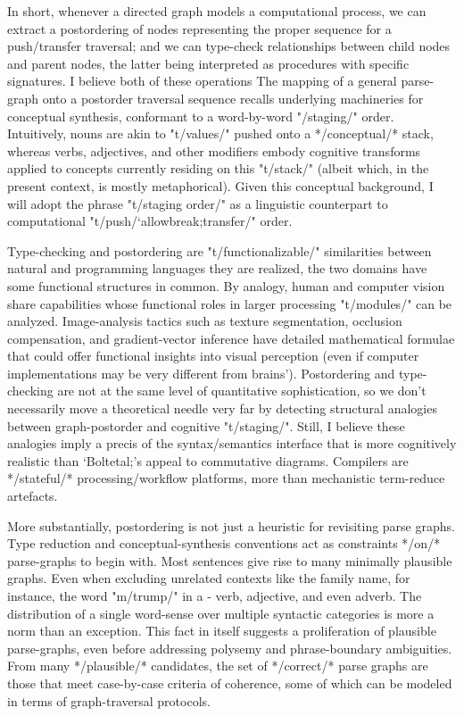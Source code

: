 In short, whenever a directed graph models a computational 
process, we can extract a postordering of nodes 
representing the proper sequence for a push/transfer traversal; 
and we can type-check relationships between 
child nodes and parent nodes, the latter being interpreted 
as procedures with specific signatures.  I believe 
both of these operations %
The mapping of a general parse-graph onto 
a postorder traversal sequence recalls   
underlying machineries for conceptual synthesis, 
conformant to a word-by-word "/staging/" order.  
Intuitively, nouns are akin to 
"t/values/" pushed onto a */conceptual/* stack, 
whereas verbs, adjectives, and other modifiers 
embody cognitive transforms applied to concepts 
currently residing on this "t/stack/" 
(albeit which, in the present context, is mostly metaphorical).  
Given this conceptual background, I will adopt the 
phrase "t/staging order/" as a linguistic 
counterpart to computational "t/push/`allowbreak;transfer/" order. 

Type-checking and postordering are "t/functionalizable/" 
similarities between natural and programming languages 
they are realized, the two domains have some 
functional structures in common.  By analogy, 
human and computer vision share capabilities 
whose functional roles in larger processing "t/modules/" 
can be analyzed.  Image-analysis tactics such as texture 
segmentation, occlusion compensation, and gradient-vector inference 
have detailed mathematical formulae that could offer functional insights into 
visual perception (even if computer implementations may 
be very different from brains').  Postordering and type-checking are 
not at the same level of quantitative sophistication, 
so we don't necessarily move a theoretical needle very far 
by detecting structural analogies between graph-postorder 
and cognitive "t/staging/".  Still, 
I believe these analogies imply a precis of the 
syntax/semantics interface that is more cognitively realistic 
than `Boltetal;'s appeal to commutative diagrams.  Compilers 
are */stateful/* processing/workflow platforms, 
more than mechanistic term-reduce artefacts.

More substantially, postordering is not just a heuristic 
for revisiting parse graphs.  Type reduction and 
conceptual-synthesis conventions act as constraints 
*/on/* parse-graphs to begin with.  Most sentences give rise 
to many minimally plausible graphs.  Even when excluding 
unrelated contexts like the family name, for instance, the 
word "m/trump/" in a -%
verb, adjective, and even adverb.  The distribution of a 
single word-sense over multiple syntactic categories is more a 
norm than an exception.  This fact in itself suggests a proliferation 
of plausible parse-graphs, even before addressing polysemy and 
phrase-boundary ambiguities.  From many */plausible/* candidates, 
the set of */correct/* parse graphs are those that meet 
case-by-case criteria of coherence, some of which can be modeled in terms 
of graph-traversal protocols.  

